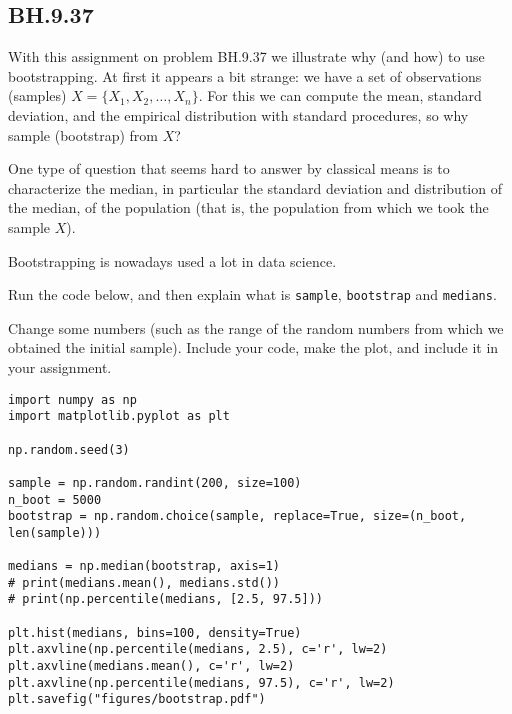 
\subsection{BH.9.37}


With this assignment on problem BH.9.37 we illustrate why (and how) to use bootstrapping. At first it appears a bit strange: we have a set of observations (samples) $X=\{X_{1}, X_2, \ldots, X_{n}\}$. For this we can compute the mean, standard deviation, and the empirical distribution with standard procedures, so why sample (bootstrap) from $X$?

One type of question that seems hard to answer by classical means is to characterize the median, in particular the standard deviation and distribution of the median, of the population (that is, the population from which we took the sample $X$).

Bootstrapping is nowadays used a lot in data science.

\begin{exercise}
Run the code below, and then explain what is \texttt{sample}, \texttt{bootstrap} and \texttt{medians}.
\end{exercise}

\begin{exercise}
Change some numbers (such as the range of the random numbers from which we obtained the initial sample). Include your code,  make the plot, and include it in your assignment.
\end{exercise}

\begin{verbatim}
import numpy as np
import matplotlib.pyplot as plt

np.random.seed(3)

sample = np.random.randint(200, size=100)
n_boot = 5000
bootstrap = np.random.choice(sample, replace=True, size=(n_boot, len(sample)))

medians = np.median(bootstrap, axis=1)
# print(medians.mean(), medians.std())
# print(np.percentile(medians, [2.5, 97.5]))

plt.hist(medians, bins=100, density=True)
plt.axvline(np.percentile(medians, 2.5), c='r', lw=2)
plt.axvline(medians.mean(), c='r', lw=2)
plt.axvline(np.percentile(medians, 97.5), c='r', lw=2)
plt.savefig("figures/bootstrap.pdf")
\end{verbatim}

